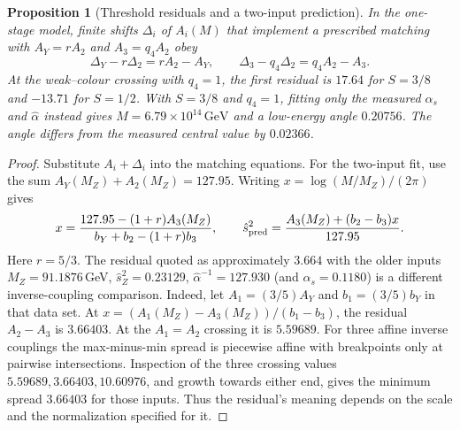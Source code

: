 \documentclass[aps,pra,onecolumn,superscriptaddress,nofootinbib,10pt]{revtex4-2}
\newtheorem{proposition}[theorem]{Proposition}
\theoremstyle{definition}
\theoremstyle{remark}
\begin{document}
\begin{proposition}[Threshold residuals and a two-input prediction]\label{cr:thresholds}
In the one-stage model, finite shifts $\Delta_i$ of $A_i(M)$
that implement a prescribed matching with $A_Y=rA_2$ and
$A_3=q_4A_2$ obey
\[
 \Delta_Y-r\Delta_2=rA_2-A_Y,\qquad
 \Delta_3-q_4\Delta_2=q_4A_2-A_3 .
\]
At the weak--colour crossing with $q_4=1$, the first residual
is $17.64$ for $S=3/8$ and $-13.71$ for $S=1/2$.
With $S=3/8$ and $q_4=1$, fitting only the measured
$\alpha_s$ and $\hat\alpha$ instead gives
$M=6.79\times10^{14}\,\mathrm{GeV}$ and a low-energy angle
$0.20756$. The angle differs from the measured central value
by $0.02366$.
\end{proposition}
\begin{proof}
Substitute $A_i+\Delta_i$ into the matching equations. For the
two-input fit, use the sum $A_Y(M_Z)+A_2(M_Z)=127.95$.
Writing $x=\log(M/M_Z)/(2\pi)$ gives
\[
 x=\frac{127.95-(1+r)A_3(M_Z)}
          {b_Y+b_2-(1+r)b_3},\qquad
 \hat s_{\rm pred}^2=\frac{A_3(M_Z)+(b_2-b_3)x}{127.95}.
\]
Here $r=5/3$. The residual quoted as approximately $3.664$
with the older inputs $M_Z=91.1876$\,GeV, $\hat s_Z^2=0.23129$, $\hat\alpha^{-1}=127.930$
(and $\alpha_s=0.1180$) is a different
inverse-coupling comparison. Indeed, let $A_1=(3/5)A_Y$ and
$b_1=(3/5)b_Y$ in that data set. At
$x=(A_1(M_Z)-A_3(M_Z))/(b_1-b_3)$, the residual $A_2-A_3$
is $3.66403$. At the $A_1=A_2$ crossing it is $5.59689$.
For three affine inverse couplings the max-minus-min spread is
piecewise affine with breakpoints only at pairwise intersections.
Inspection of the three crossing values $5.59689,3.66403,10.60976$,
and growth towards either end, gives the minimum spread $3.66403$
for those inputs. Thus the residual's meaning depends on the
scale and the normalization specified for it.
\end{proof}
\end{document}
